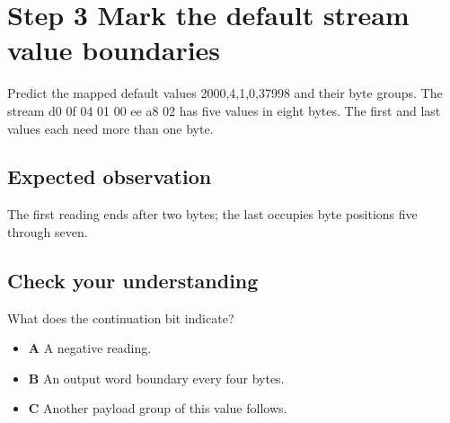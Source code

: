 \section{Step 3 Mark the default stream value boundaries}\label{delta-s03}

Predict the mapped default values 2000,4,1,0,37998 and their byte groups. The stream d0 0f 04 01 00 ee a8 02 has five values in eight bytes. The first and last values each need more than one byte.

\subsection{Expected observation}
The first reading ends after two bytes; the last occupies byte positions five through seven.

\subsection{Check your understanding}
What does the continuation bit indicate?

\begin{itemize}
\item \textbf{A} A negative reading.
\item \textbf{B} An output word boundary every four bytes.
\item \textbf{C} Another payload group of this value follows.
\end{itemize}
